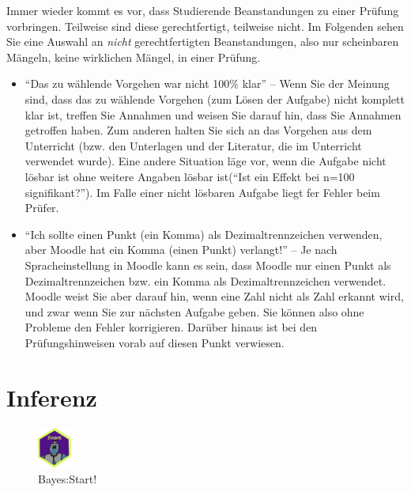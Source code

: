 \documentclass[
  a4paper,
  DIV=11]{scrreprt}
\theoremstyle{definition}
\theoremstyle{remark}
\begin{document}
Immer wieder kommt es vor, dass Studierende Beanstandungen zu einer
Prüfung vorbringen. Teilweise sind diese gerechtfertigt, teilweise
nicht. Im Folgenden sehen Sie eine Auswahl an \emph{nicht}
gerechtfertigten Beanstandungen, also nur scheinbaren Mängeln, keine
wirklichen Mängel, in einer Prüfung.

\begin{itemize}
\item
  ``Das zu wählende Vorgehen war nicht 100\% klar'' -- Wenn Sie der
  Meinung sind, dass das zu wählende Vorgehen (zum Lösen der Aufgabe)
  nicht komplett klar ist, treffen Sie Annahmen und weisen Sie darauf
  hin, dass Sie Annahmen getroffen haben. Zum anderen halten Sie sich an
  das Vorgehen aus dem Unterricht (bzw. den Unterlagen und der
  Literatur, die im Unterricht verwendet wurde). Eine andere Situation
  läge vor, wenn die Aufgabe nicht lösbar ist ohne weitere Angaben
  lösbar ist(``Ist ein Effekt bei n=100 signifikant?''). Im Falle einer
  nicht lösbaren Aufgabe liegt fer Fehler beim Prüfer.
\item
  ``Ich sollte einen Punkt (ein Komma) als Dezimaltrennzeichen
  verwenden, aber Moodle hat ein Komma (einen Punkt) verlangt!'' -- Je
  nach Spracheinstellung in Moodle kann es sein, dass Moodle nur einen
  Punkt als Dezimaltrennzeichen bzw. ein Komma als Dezimaltrennzeichen
  verwendet. Moodle weist Sie aber darauf hin, wenn eine Zahl nicht als
  Zahl erkannt wird, und zwar wenn Sie zur nächsten Aufgabe geben. Sie
  können also ohne Probleme den Fehler korrigieren. Darüber hinaus ist
  bei den Prüfungshinweisen vorab auf diesen Punkt verwiesen.
\end{itemize}


\hypertarget{inferenz}{%
\chapter{Inferenz}\label{inferenz}}

\begin{figure}

{\centering \includegraphics[width=0.1\textwidth,height=\textheight]{./img/Golem_hex.png}

}

\caption{Bayes:Start!}

\end{figure}
\end{document}
